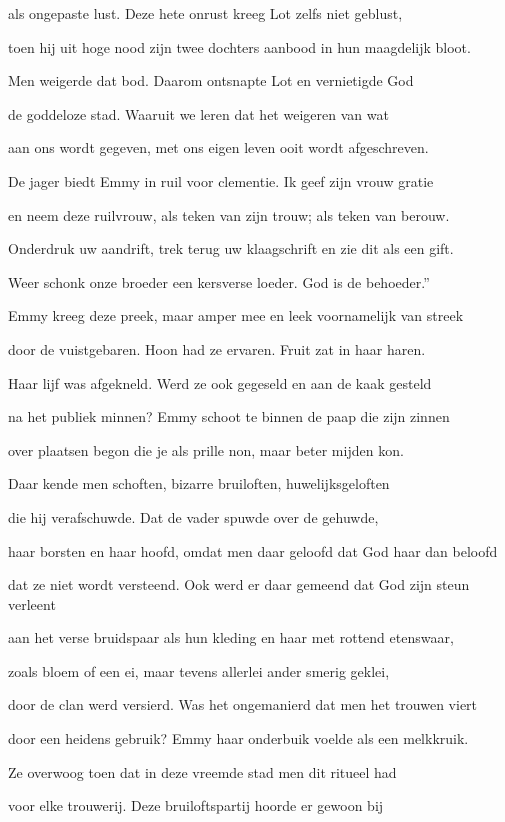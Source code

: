 als ongepaste lust.
Deze hete onrust
kreeg Lot zelfs niet geblust,

toen hij uit hoge nood
zijn twee dochters aanbood
in hun maagdelijk bloot.

Men weigerde dat bod.
Daarom ontsnapte Lot
en vernietigde God

de goddeloze stad.
Waaruit we leren dat
het weigeren van wat

aan ons wordt gegeven,
met ons eigen leven
ooit wordt afgeschreven.

De jager biedt Emmy
in ruil voor clementie.
Ik geef zijn vrouw gratie

en neem deze ruilvrouw,
als teken van zijn trouw;
als teken van berouw.

Onderdruk uw aandrift,
trek terug uw klaagschrift
en zie dit als een gift.

Weer schonk onze broeder
een kersverse loeder.
God is de behoeder.”

Emmy kreeg deze preek,
maar amper mee en leek
voornamelijk van streek

door de vuistgebaren.
Hoon had ze ervaren.
Fruit zat in haar haren.

Haar lijf was afgekneld.
Werd ze ook gegeseld
en aan de kaak gesteld

na het publiek minnen?
Emmy schoot te binnen
de paap die zijn zinnen

over plaatsen begon
die je als prille non,
maar beter mijden kon.

Daar kende men schoften,
bizarre bruiloften,
huwelijksgeloften

die hij verafschuwde.
Dat de vader spuwde
over de gehuwde,

haar borsten en haar hoofd,
omdat men daar geloofd
dat God haar dan beloofd

dat ze niet wordt versteend.
Ook werd er daar gemeend
dat God zijn steun verleent

aan het verse bruidspaar
als hun kleding en haar
met rottend etenswaar,

zoals bloem of een ei,
maar tevens allerlei
ander smerig geklei,

door de clan werd versierd.
Was het ongemanierd
dat men het trouwen viert

door een heidens gebruik?
Emmy haar onderbuik
voelde als een melkkruik.

Ze overwoog toen dat
in deze vreemde stad
men dit ritueel had

voor elke trouwerij.
Deze bruiloftspartij
hoorde er gewoon bij

